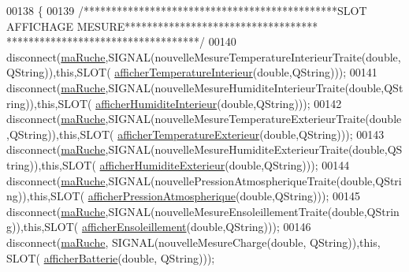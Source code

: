 \begin{DoxyCode}
00138 \{
00139     \textcolor{comment}{/**********************************************SLOT AFFICHAGE MESURE***********************************
      ***********************************/}
00140     disconnect(\hyperlink{class_ruche_ihm_a43a6b1fa31f4fba58d919daae3707b38}{maRuche},SIGNAL(nouvelleMesureTemperatureInterieurTraite(\textcolor{keywordtype}{double},QString)),\textcolor{keyword}{this},SLOT(
      \hyperlink{class_ruche_ihm_a4b8483705f88b46e253ef73068cd8f2e}{afficherTemperatureInterieur}(\textcolor{keywordtype}{double},QString)));
00141     disconnect(\hyperlink{class_ruche_ihm_a43a6b1fa31f4fba58d919daae3707b38}{maRuche},SIGNAL(nouvelleMesureHumiditeInterieurTraite(\textcolor{keywordtype}{double},QString)),\textcolor{keyword}{this},SLOT(
      \hyperlink{class_ruche_ihm_a4ab4b1ba1618a9aaf5bdb7f51df987aa}{afficherHumiditeInterieur}(\textcolor{keywordtype}{double},QString)));
00142     disconnect(\hyperlink{class_ruche_ihm_a43a6b1fa31f4fba58d919daae3707b38}{maRuche},SIGNAL(nouvelleMesureTemperatureExterieurTraite(\textcolor{keywordtype}{double},QString)),\textcolor{keyword}{this},SLOT(
      \hyperlink{class_ruche_ihm_a63e3a82b98678d00d57748e80fe5258b}{afficherTemperatureExterieur}(\textcolor{keywordtype}{double},QString)));
00143     disconnect(\hyperlink{class_ruche_ihm_a43a6b1fa31f4fba58d919daae3707b38}{maRuche},SIGNAL(nouvelleMesureHumiditeExterieurTraite(\textcolor{keywordtype}{double},QString)),\textcolor{keyword}{this},SLOT(
      \hyperlink{class_ruche_ihm_a6381018a7dc88cb966d7bbc49515495e}{afficherHumiditeExterieur}(\textcolor{keywordtype}{double},QString)));
00144     disconnect(\hyperlink{class_ruche_ihm_a43a6b1fa31f4fba58d919daae3707b38}{maRuche},SIGNAL(nouvellePressionAtmospheriqueTraite(\textcolor{keywordtype}{double},QString)),\textcolor{keyword}{this},SLOT(
      \hyperlink{class_ruche_ihm_ab38e4be7a1f39c862d7d8ab2ed3de98e}{afficherPressionAtmospherique}(\textcolor{keywordtype}{double},QString)));
00145     disconnect(\hyperlink{class_ruche_ihm_a43a6b1fa31f4fba58d919daae3707b38}{maRuche},SIGNAL(nouvelleMesureEnsoleillementTraite(\textcolor{keywordtype}{double},QString)),\textcolor{keyword}{this},SLOT(
      \hyperlink{class_ruche_ihm_a8ee0041a209452e8e77f4a50adabff2b}{afficherEnsoleillement}(\textcolor{keywordtype}{double},QString)));
00146     disconnect(\hyperlink{class_ruche_ihm_a43a6b1fa31f4fba58d919daae3707b38}{maRuche}, SIGNAL(nouvelleMesureCharge(\textcolor{keywordtype}{double}, QString)),\textcolor{keyword}{this}, SLOT(
      \hyperlink{class_ruche_ihm_a3934082a49b22f4c6096d96887a11591}{afficherBatterie}(\textcolor{keywordtype}{double}, QString)));

\end{DoxyCode}
